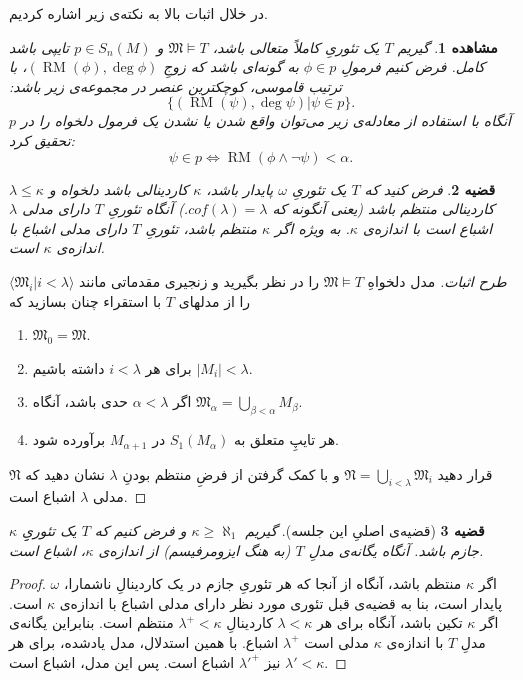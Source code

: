 \documentclass[12pt,a4paper]{report}
\theoremstyle{colorhead}
\newtheorem{thm}{قضیه}
\newtheorem{moshahede}[thm]{مشاهده}
\DeclareMathOperator{\RM}{RM}
\begin{document}
در خلال اثبات بالا به نکته‌ی زیر اشاره کردیم.
\begin{moshahede}
	گیریم
	$T$
	یک تئوریِ کاملاً متعالی باشد،
$\mathfrak{M}\models T$
	  و
	$p\in S_n(M)$
	تایپی  باشد 
	کامل. فرض کنیم فرمولِ
	$\phi\in p$
	به گونه‌ای باشد که زوجِ
	$(\RM(\phi),\deg \phi)$،
	با ترتیب قاموسی، کوچکترین عنصر در مجموعه‌ی زیر باشد:
	\[
\{	(\RM(\psi),\deg \psi)|\psi\in p\}.
	\]
آنگاه با استفاده از معادله‌ی زیر می‌توان واقع شدن یا نشدن یک فرمول دلخواه را در
$p$
تحقیق کرد:
\[
\psi\in p\Leftrightarrow \RM(\phi\wedge\neg \psi)<\alpha.
\]
	\end{moshahede}
\begin{thm}
	فرض  کنید که
	$T$
یک تئوریِ
$\omega$
پایدار باشد، 
$\kappa$
کاردینالی باشد دلخواه  و
$\lambda\leq \kappa$
کاردینالی منتظم باشد (یعنی آنگونه که 
$cof(\lambda)=\lambda$.)
آنگاه تئوریِ
$T$
دارای مدلی 
$\lambda$اشباع
 است با اندازه‌ی
$\kappa$.
به ويژه اگر
$\kappa$
منتظم باشد، تئوریِ
$T$
دارای مدلی اشباع با اندازه‌ی
$\kappa$
است.
	\end{thm}
\begin{proof}[طرح اثبات]
	مدل دلخواهِ
	$\mathfrak{M}\models T$
	را در نظر بگیرید و زنجیری مقدماتی مانند
	$\langle \mathfrak{M}_i|i<\lambda\rangle$
	را از مدلهای 
	$T$
	با استقراء چنان بسازید که 
	\begin{enumerate}
\item 
$\mathfrak{M}_0=\mathfrak{M}$.
		\item 
		برای هر 
		$i<\lambda$
		داشته باشیم
		$|M_i|<\lambda$.
		\item 
		اگر
		$\alpha<\lambda$
		حدی باشد، آنگاه
		$\mathfrak{M}_\alpha=\bigcup_{\beta<\alpha}M_\beta$.
		\item 
		هر تایپِ متعلق به
		$S_1(M_\alpha)$
		در
		$M_{\alpha+1}$
		برآورده شود.
\end{enumerate}
قرار دهید
$\mathfrak{N}=\bigcup_{i<\lambda} \mathfrak{M}_i$
و با کمک گرفتن از فرضِ منتظم بودنِ
$\lambda$
نشان دهید که
$\mathfrak{N}$
مدلی
$\lambda$
اشباع است.
	\end{proof}
\begin{thm}[قضیه‌ی اصلیِ این جلسه]
	گیریم
	$\kappa\geq \aleph_1$
	و فرض کنیم که 
	$T$
	یک
	تئوریِِ
	$\kappa$
	جازم  باشد. آنگاه یگانه‌ی مدلِ
	$T$
	(به هنگ ایزومرفیسم) از اندازه‌ی
$\kappa$،
اشباع است.
	\end{thm}
\begin{proof}
	اگر
	$\kappa$
	منتظم باشد، آنگاه از آنجا که هر تئوریِ جازم در یک کاردینالِ ناشمارا،
	$\omega$
	پایدار است، بنا به قضیه‌ی قبل تئوری مورد نظر دارای مدلی اشباع با اندازه‌ی
	$\kappa$
	است. اگر
	$\kappa$
	تکین باشد، آنگاه برای هر 
	$\lambda<\kappa$
	کاردینالِ
	$\lambda^+<\kappa$
	منتظم است.  بنابراین یگانه‌ی مدلِ
	$T$
	با اندازه‌ی
	$\kappa$
	مدلی است 
	$\lambda^+$
	اشباع. با همین استدلال، مدل یادشده، برای هر
	$\lambda'<\kappa$
نیز
$\lambda'^+$
اشباع است. پس این مدل، اشباع است. 
	\end{proof}
\pagebreak
\end{document}
